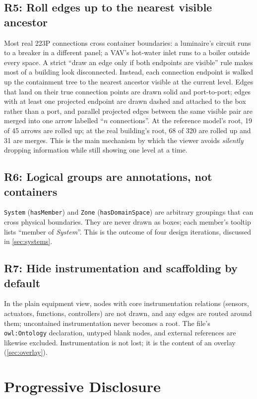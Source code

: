 \documentclass[10pt,twocolumn]{article}
\newcommand{\pred}[1]{\texttt{#1}}   %
\begin{document}
\subsection{R5: Roll edges up to the nearest visible ancestor}
Most real 223P connections cross container boundaries: a luminaire's circuit runs
to a breaker in a different panel; a VAV's hot-water inlet runs to a boiler
outside every space. A strict ``draw an edge only if both endpoints are visible''
rule makes most of a building look disconnected. Instead, each connection
endpoint is walked up the containment tree to the nearest ancestor visible at the
current level. Edges that land on their true connection points are drawn solid
and port-to-port; edges with at least one projected endpoint are drawn dashed and
attached to the box rather than a port, and parallel projected edges between the
same visible pair are merged into one arrow labelled ``$n$ connections''. At the
reference model's root, 19 of 45 arrows are rolled up; at the real building's
root, 68 of 320 are rolled up and 31 are merges. This is the main mechanism by
which the viewer avoids \emph{silently} dropping information while still showing
one level at a time.

\subsection{R6: Logical groups are annotations, not containers}
\pred{System} (\pred{hasMember}) and \pred{Zone} (\pred{hasDomainSpace}) are
arbitrary groupings that can cross physical boundaries. They are never drawn as
boxes; each member's tooltip lists ``member of \emph{System}''. This is the
outcome of four design iterations, discussed in \cref{sec:systems}.

\subsection{R7: Hide instrumentation and scaffolding by default}
In the plain equipment view, nodes with core instrumentation relations (sensors,
actuators, functions, controllers) are not drawn, and any edges are routed around
them; uncontained instrumentation never becomes a root. The file's
\pred{owl:Ontology} declaration, untyped blank nodes, and external references are
likewise excluded. Instrumentation is not lost; it is the content of an overlay
(\cref{sec:overlay}).

\section{Progressive Disclosure}
\label{sec:disclosure}
\end{document}
